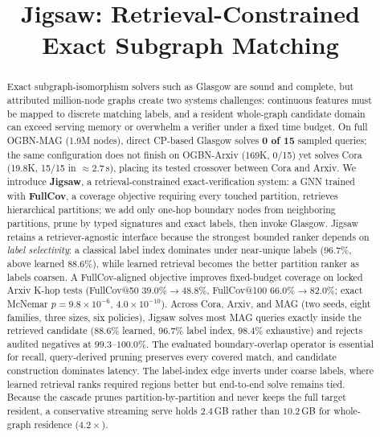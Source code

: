 \documentclass[runningheads]{llncs}
\begin{document}
\title{Jigsaw: Retrieval-Constrained Exact Subgraph Matching}
\author{}
\institute{}
\maketitle

\begin{abstract}
Exact subgraph-isomorphism solvers such as Glasgow are sound and complete, but attributed million-node graphs create two systems challenges: continuous features must be mapped to discrete matching labels, and a resident whole-graph candidate domain can exceed serving memory or overwhelm a verifier under a fixed time budget. On full OGBN-MAG (1.9M nodes), direct CP-based Glasgow solves \textbf{0 of 15} sampled queries; the same configuration does not finish on OGBN-Arxiv (169K, 0/15) yet solves Cora (19.8K, 15/15 in ${\approx}2.7$\,s), placing its tested crossover between Cora and Arxiv. We introduce \textbf{Jigsaw}, a retrieval-constrained exact-verification system: a GNN trained with \textbf{FullCov}, a coverage objective requiring every touched partition, retrieves hierarchical partitions; we add only one-hop boundary nodes from neighboring partitions, prune by typed signatures and exact labels, then invoke Glasgow. Jigsaw retains a retriever-agnostic interface because the strongest bounded ranker depends on \emph{label selectivity}: a classical label index dominates under near-unique labels ($96.7\%$, above learned $88.6\%$), while learned retrieval becomes the better partition ranker as labels coarsen. A FullCov-aligned objective improves fixed-budget coverage on locked Arxiv K-hop tests (FullCov@50 $39.0\%{\to}48.8\%$, FullCov@100 $66.0\%{\to}82.0\%$; exact McNemar $p=9.8{\times}10^{-6}$, $4.0{\times}10^{-10}$). Across Cora, Arxiv, and MAG (two seeds, eight families, three sizes, six policies), Jigsaw solves most MAG queries exactly inside the retrieved candidate ($88.6\%$ learned, $96.7\%$ label index, $98.4\%$ exhaustive) and rejects audited negatives at $99.3$--$100.0\%$. The evaluated boundary-overlap operator is essential for recall, query-derived pruning preserves every covered match, and candidate construction dominates latency. The label-index edge inverts under coarse labels, where learned retrieval ranks required regions better but end-to-end solve remains tied. Because the cascade prunes partition-by-partition and never keeps the full target resident, a conservative streaming serve holds $2.4$\,GB rather than $10.2$\,GB for whole-graph residence ($4.2\times$).
\end{abstract}
\end{document}
